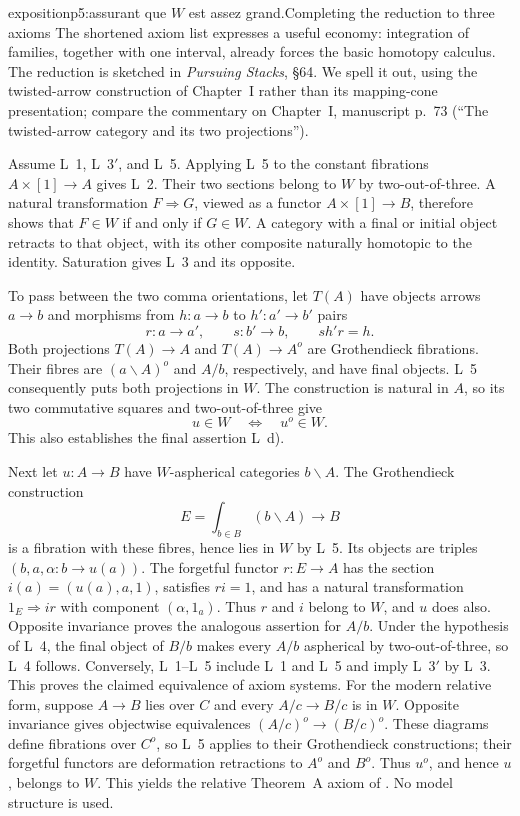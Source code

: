 \begin{dcomment}{exposition}{p5:assurant que $W$ est assez grand.}{Completing the reduction to three axioms}
The shortened axiom list expresses a useful economy: integration of families, together with one interval, already forces the basic homotopy calculus. The reduction is sketched in \emph{Pursuing Stacks}, \S64. We spell it out, using the twisted-arrow construction of Chapter~I rather than its mapping-cone presentation; compare the commentary on Chapter~I, manuscript p.~73 (``The twisted-arrow category and its two projections'').

Assume L~1, L~3$'$, and L~5. Applying L~5 to the constant fibrations $A\times[1]\to A$ gives L~2. Their two sections belong to $W$ by two-out-of-three. A natural transformation $F\Rightarrow G$, viewed as a functor $A\times[1]\to B$, therefore shows that $F\in W$ if and only if $G\in W$. A category with a final or initial object retracts to that object, with its other composite naturally homotopic to the identity. Saturation gives L~3 and its opposite.

To pass between the two comma orientations, let $T(A)$ have objects arrows $a\to b$ and morphisms from $h:a\to b$ to $h':a'\to b'$ pairs
\[
 r:a\to a',\qquad s:b'\to b,\qquad s h'r=h.
\]
Both projections $T(A)\to A$ and $T(A)\to A^o$ are Grothendieck fibrations. Their fibres are $(a\backslash A)^o$ and $A/b$, respectively, and have final objects. L~5 consequently puts both projections in $W$. The construction is natural in $A$, so its two commutative squares and two-out-of-three give
\[
 u\in W\quad\Longleftrightarrow\quad u^o\in W.
\]
This also establishes the final assertion L~d).

Next let $u:A\to B$ have $W$-aspherical categories $b\backslash A$. The Grothendieck construction
\[
 E=\int_{b\in B}(b\backslash A)\longrightarrow B
\]
is a fibration with these fibres, hence lies in $W$ by L~5. Its objects are triples $(b,a,\alpha:b\to u(a))$. The forgetful functor $r:E\to A$ has the section $i(a)=(u(a),a,1)$, satisfies $ri=1$, and has a natural transformation $1_E\Rightarrow ir$ with component $(\alpha,1_a)$. Thus $r$ and $i$ belong to $W$, and $u$ does also. Opposite invariance proves the analogous assertion for $A/b$. Under the hypothesis of L~4, the final object of $B/b$ makes every $A/b$ aspherical by two-out-of-three, so L~4 follows. Conversely, L~1--L~5 include L~1 and L~5 and imply L~3$'$ by L~3. This proves the claimed equivalence of axiom systems. For the modern relative form, suppose $A\to B$ lies over $C$ and every $A/c\to B/c$ is in $W$. Opposite invariance gives objectwise equivalences $(A/c)^o\to(B/c)^o$. These diagrams define fibrations over $C^o$, so L~5 applies to their Grothendieck constructions; their forgetful functors are deformation retractions to $A^o$ and $B^o$. Thus $u^o$, and hence $u$, belongs to $W$. This yields the relative Theorem~A axiom of \citet[Definition~1.1.3]{Cisinski2004Minimal}. No model structure is used.
\end{dcomment}

